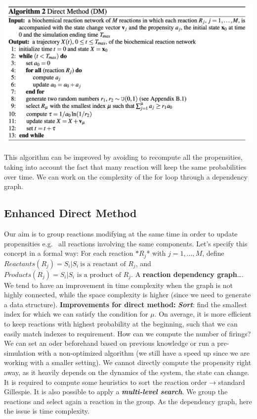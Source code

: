 \includegraphics{direct_method.png}

This algorithm can be improved by avoiding to recompute all the propensities, taking into account the fact that many reaction will keep the same probabilities over time.
We can work on the complexity of the for loop through a dependency graph.

  \subsection{Enhanced Direct Method}
  Our aim is to group reactions modifying at the same time in order to update propensities e.g. ~all reactions involving the same components.
  Let's specify this concept in a formal way: For each reaction $*R_j$* with $j = 1,...,M$, define $Reactants(R_j)={S_i|S_i \ \text{is a reactant of }R_j}$, and $Products(R_j) = {S_i|S_i \text{ is a product of }R_j}$.
  A \textbf{reaction dependency graph}\ldots{}.
  We tend to have an improvement in time complexity when the graph is not highly connected, while the space complexity is higher (since we need to generate a data structure).
  \textbf{Improvements for direct method:} \textbf{\emph{Sort}}: find the smallest index for which we can satisfy the condition for $\mu$.
  On average, it is more efficient to keep reactions with highest probability at the beginning, such that we can easily match indexes to requirement.
  How can we compute the number of firings? We can set an oder beforehand based on previous knowledge or run a pre-simulation with a non-optimized algorithm (we still have a speed up since we are working with a smaller setting).
  We cannot directly compute the propensity right away, as it heavily depends on the dynamics of the system, the state can change.
  It is required to compute some heuristics to sort the reaction order → standard Gillespie.
  It is also possible to apply a \textbf{\emph{multi-level search}}.
  We group the reactions and select again a reaction in the group.
  As the dependency graph, here the issue is time complexity.

